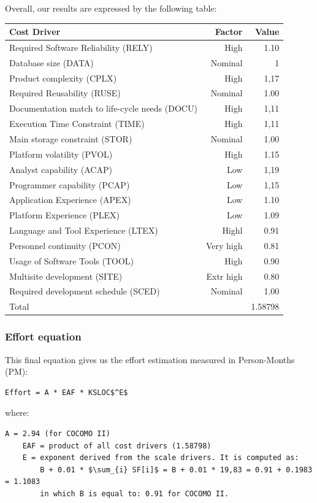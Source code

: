 \documentclass[english]{article}
\newcommand{\fptotal}[1]{
	\multicolumn{2}{|l|}{{Total}}
	& #1\\\hline
}
\newenvironment{factorcounttable}[1]{
	\begin{center}
	\begin{longtable}{|l|r|r|}
	\hline 
	#1 & Factor & Value \\\hline
}{
	\end{longtable}\end{center}
}
\begin{document}
Overall, our results are expressed by the following table:
\begin{factorcounttable}{Cost Driver}
	Required Software Reliability (RELY) & High & 1.10\\
	Database size (DATA) & Nominal & 1\\
	Product complexity (CPLX) & High & 1,17\\
	Required Reusability (RUSE) & Nominal & 1.00\\
	Documentation match to life-cycle needs (DOCU) & High & 1,11\\
	Execution Time Constraint (TIME) & High & 1,11 \\
	Main storage constraint (STOR) & Nominal & 1.00 \\
	Platform volatility (PVOL) & High & 1.15 \\
	Analyst capability (ACAP) & Low & 1,19 \\
	Programmer capability (PCAP) & Low & 1,15 \\
	Application Experience (APEX) & Low & 1.10 \\
	Platform Experience (PLEX) & Low & 1.09 \\
	Language and Tool Experience (LTEX) & Highl & 0.91 \\
	Personnel continuity (PCON) & Very high & 0.81 \\
	Usage of Software Tools (TOOL) & High & 0.90 \\
	Multisite development (SITE) & Extr high & 0.80\\
	Required development schedule (SCED) & Nominal & 1.00 \\\hline
	\fptotal{1.58798}
\end{factorcounttable}

\subsubsection{Effort equation}
This final equation gives us the effort estimation measured in Person-Months (PM):
\begin{lstlisting}[mathescape, numbers=none, frame=single]
	Effort = A * EAF * KSLOC$^E$
\end{lstlisting}
where:
\begin{lstlisting}[mathescape, numbers=none, frame=single]
	A = 2.94 (for COCOMO II) 
	EAF = product of all cost drivers (1.58798)
	E = exponent derived from the scale drivers. It is computed as:
		B + 0.01 * $\sum_{i} SF[i]$ = B + 0.01 * 19,83 = 0.91 + 0.1983 = 1.1083
		in which B is equal to: 0.91 for COCOMO II.
\end{lstlisting}
\end{document}
